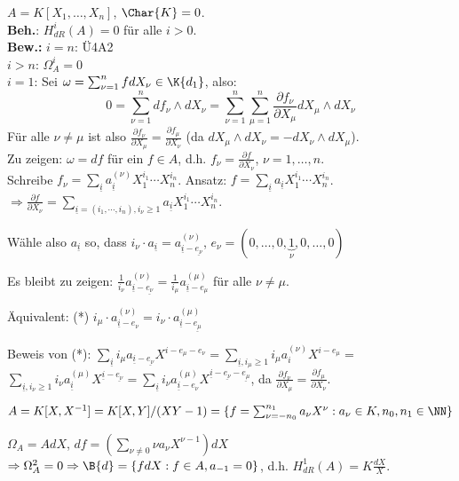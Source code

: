 \begin{nnBsp}
$A=K[X_1, \ldots, X_n]$, $\Char{K}=0$.\\
\textbf{Beh.}: $H_{dR}^i(A) = 0$ f\"ur alle $i>0$.\\
\textbf{Bew.: } $i=n$: \"U4A2\\
$i>n$: $\Omega_A^i=0$\\
$i=1$: Sei $\omega=\sum_{\nu=1}^nf dX_\nu\in \K{d_1}$, also:
\[
0=\sum_{\nu=1}^n df_\nu \wedge dX_\nu=\sum_{\nu=1}^n \sum_{\mu=1}^n
\frac{\partial f_\nu}{\partial X_\mu}dX_\mu\wedge dX_\nu
\]
F\"ur alle $\nu\neq \mu$ ist also $\frac{\partial f_\nu}{\partial X_\mu}=\frac{\partial f_\mu}{\partial X_\nu}$
(da $dX_\mu\wedge dX_\nu = -dX_\nu\wedge dX_\mu$).\\
Zu zeigen: $\omega = df$ f\"ur ein $f\in A$, d.h. $f_\nu=\frac{\partial f}{\partial X_\nu}$, $\nu=1, \ldots, n$.\\
Schreibe $f_\nu=\sum_{\underline{i}} a_{\underline{i}}^{(\nu)}X_1^{i_1}\cdots X_n^{i_n}$.
Ansatz: $f=\sum_{\underline{i}} a_{\underline{i}} X_1^{i_1}\cdots X_n^{i_n}$.
$\Rightarrow \frac{\partial f}{\partial X_\nu}
=\sum_{\underline{i}=(i_1, \cdots, i_n), i_\nu\geq 1}a_{\underline{i}} X_1^{i_1}\cdots X_n^{i_n}$.

W\"ahle also $a_{\underline{i}}$ so, dass $i_\nu\cdot a_{\underline{i}} = a_{\underline{i}-\underline{e_\nu}}^{(\nu)}$,
$e_\nu=(0,\ldots,0,\underbrace{1}_{\nu},0,\ldots, 0)$

Es bleibt zu zeigen: $\frac{1}{i_\nu} a_{\underline{i}-\underline{e_\nu}}^{(\nu)}
=\frac{1}{i_\mu} a_{\underline{i}-e_\mu}^{(\mu)}$ f\"ur alle $\nu\neq \mu$.

\"Aquivalent: (*) $i_\mu\cdot a_{\underline{i}-e_{\nu}}^{(\nu)}=i_\nu \cdot a_{\underline{i}-\underline{e_\mu}}^{(\mu)}$

Beweis von (*): $
\sum_{\underline{i}} i_\mu a_{\underline{i}-\underline{e_\nu}}X^{i-e_\mu-e_\nu}
= \sum_{\underline{i}, i_\mu\geq 1} i_\mu a_{i}^{(\nu)} X^{i-e_\mu}=$\\
$\sum_{\underline{i}, i_\nu\geq 1}i_\nu a_{\underline{i}}^{(\mu)}X^{\underline{i}-\underline{e_\nu}}
= \sum_{\underline{i}} i_\nu a_{\underline{i}-e_\nu}^{(\mu)}X^{\underline{i}-\underline{e_\nu}-\underline{e_\mu}}$,
da $\frac{\partial f_\nu}{\partial X_\mu} = \frac{\partial f_\mu}{\partial X_\nu}$.
\end{nnBsp}

\begin{nnBsp}
$A=K[X, X^{-1}]=K[X,Y]/(XY-1)=\{f=\sum_{\nu=-n_0}^{n_1} a_\nu X^\nu: a_\nu\in K, n_0, n_1\in \NN\}$

$\Omega_A=AdX$, $df=(\sum_{\nu\neq 0}\nu a_\nu X^{\nu-1})dX$
$\Rightarrow \Omega_A^2 = 0 \Rightarrow \B{d}=\{fdX:f\in A, a_{-1}=0\}$,
d.h. $H_{dR}^{1}(A) = K\frac{dX}{X}$.
\end{nnBsp}
